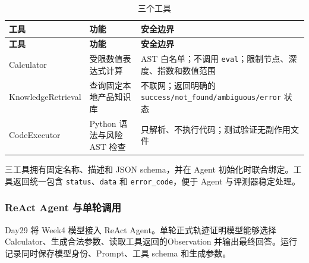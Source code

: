 \documentclass[UTF8,fontset=fandol,a4paper,11pt]{ctexart}
\begin{document}
\begin{longtable}[]{@{}
  >{\raggedright\arraybackslash}p{}
  >{\raggedright\arraybackslash}p{}
  >{\raggedright\arraybackslash}p{}@{}}
\caption{三个工具}\tabularnewline
\toprule\noalign{}
\begin{minipage}[b]{\linewidth}\raggedright
\textbf{工具}
\end{minipage} & \begin{minipage}[b]{\linewidth}\raggedright
\textbf{功能}
\end{minipage} & \begin{minipage}[b]{\linewidth}\raggedright
\textbf{安全边界}
\end{minipage} \\
\midrule\noalign{}
\endfirsthead
\toprule\noalign{}
\begin{minipage}[b]{\linewidth}\raggedright
\textbf{工具}
\end{minipage} & \begin{minipage}[b]{\linewidth}\raggedright
\textbf{功能}
\end{minipage} & \begin{minipage}[b]{\linewidth}\raggedright
\textbf{安全边界}
\end{minipage} \\
\midrule\noalign{}
\endhead
\bottomrule\noalign{}
\endlastfoot
Calculator & 受限数值表达式计算 & AST 白名单；不调用
\nolinkurl{eval}；限制节点、深度、指数和数值范围 \\
KnowledgeRetrieval & 查询固定本地产品知识库 & 不联网；返回明确的
{\nolinkurl{success/not_found/ambiguous/error}} 状态 \\
CodeExecutor & Python 语法与风险 AST 检查 &
只解析、不执行代码；测试验证无副作用文件 \\
\end{longtable}

三工具拥有固定名称、描述和 JSON schema，并在 Agent
初始化时联合绑定。工具返回统一包含 \nolinkurl{status}、\nolinkurl{data}
和 \nolinkurl{error_code}，便于 Agent 与评测器稳定处理。

\subsubsection{ReAct Agent
与单轮调用}\label{react-agent-ux4e0eux5355ux8f6eux8c03ux7528}

Day29 将 Week4 模型接入 ReAct Agent。单轮正式轨迹证明模型能够选择
Calculator、生成合法参数、读取工具返回的Observation
并输出最终回答。运行记录同时保存模型身份、Prompt、工具 schema
和生成参数。
\end{document}
